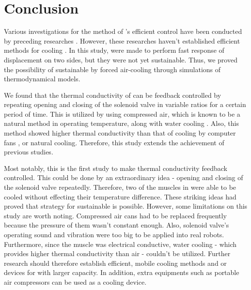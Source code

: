 \section{Conclusion}
Various investigations for the method of \scpnospace's efficient control have been conducted by preceding researches \cite{haines,mirvakili,yip}. %
However, these researches haven't established efficient methods for cooling \scpnospace. %
In this study, \antas were made to perform fast response of displacement on two sides, but they were not yet sustainable. Thus, we proved the possibility of sustainable \apc by forced air-cooling through simulations of thermodynamical models. %

We found that the thermal conductivity of \scp can be feedback controlled by repeating opening and closing of the solenoid valve in variable ratios for a certain period of time. %
This is utilized by using compressed air, which is known to be a natural method in operating temperature, along with water cooling \cite{madden}.
Also, this method showed higher thermal conductivity than that of cooling by computer fans \cite{yip}, or natural cooling.
Therefore, this study extends the achievement of previous studies.

Most notably, this is the first study to make thermal conductivity feedback controlled. 
This could be done by an extraordinary idea - opening and closing of the solenoid valve repeatedly.
Therefore, two of the muscles in \anta were able to be cooled without effecting their temperature difference.
These striking ideas had proved that strategy for sustainable \apc is possible.
However, some limitations on this study are worth noting. 
Compressed air cans had to be replaced frequently because the pressure of them wasn't constant enough. 
Also, solenoid valve's operating sound and vibration were too big to be applied into real robots.
Furthermore, since the muscle was electrical conductive, water cooling - which provides higher thermal conductivity than air \cite{finger} - couldn't be utilized.
Further research should therefore establish efficient, mobile cooling methods and or devices for \scps with larger capacity. 
In addition, extra equipments such as portable air compressors can be used as a cooling device.



